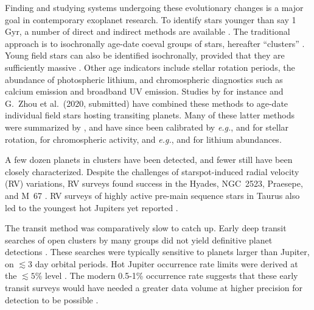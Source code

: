 \documentclass[12pt,twocolumn,tighten]{aastex63}
\begin{document}
Finding and studying systems undergoing these evolutionary changes is
a major goal in contemporary exoplanet research.  To identify stars
younger than say 1$\,$Gyr, a number of direct and indirect methods are
available \citep{soderblom_ages_2010}.  The traditional approach is to
isochronally age-date coeval groups of stars, hereafter ``clusters''
\citep[{\it
e.g.},][]{lada_embedded_2003,zuckerman_young_2004,krumholz_star_2019}.
Young field stars can also be identified
isochronally, provided that they are sufficiently massive \citep{berger_gaia-kepler_2020}. 
Other age indicators include
stellar rotation periods, the abundance of photospheric lithium, and
chromospheric diagnostics such as calcium emission and broadband UV
emission.  Studies by for instance \citet{david_discovery_2018} and
G{.}~Zhou et al{.}~(2020, submitted) have combined these methods to age-date
individual field stars hosting transiting planets.  Many of these latter methods were summarized by
\citet{mamajek_improved_2008}, and have since been calibrated by {\it
e.g.},
\citet{irwin_rotational_2009,barnes_color-period_2015,meibom_spin-down_2015,angus_calibrating_2015}
and \citet{curtis_tess_2019} for stellar rotation,
\citet{zerjal_chromospherically_2017} for chromospheric activity, and
{\it e.g.}, \citet{elliott_search_2016,berger_identifying_2018} and
\citet{zerjal_galah_2019} for lithium abundances.


A few dozen planets in clusters have been detected, and fewer still
have been closely characterized.  Despite the challenges of
starspot-induced radial velocity (RV) variations, RV surveys found
success in the Hyades, NGC~2523, Praesepe, and M~67
\citep{Sato_et_al_2007,lovis_mayor_2007,Quinn_et_al_2012,Malavolta_et_al_2016,brucalassi_search_2017}.
RV surveys of highly active pre-main sequence stars in Taurus also led
to the youngest hot Jupiters yet reported
\citep{donati_hj_2016,johns-krull_candidate_2016,biddle_k2_2018,flagg_co_2019}.

The transit method was comparatively slow to catch up.  Early deep
transit searches of open clusters by many groups did not yield
definitive planet detections
\citep{mochejska_planets_2005,mochejska_planets_2006,burke_survey_2006,aigrain_monitor_2007,irwin_monitordata_2007,miller_monitor_2008,pepper_photometric_2008,hartman_MMT_IV_2009}.
These searches were typically sensitive to planets larger than
Jupiter, on $\lesssim 3$ day orbital periods.  Hot Jupiter occurrence
rate limits were derived at the $\lesssim 5\%$ level \citep[{\it
e.g.},][]{burke_survey_2006,hartman_MMT_IV_2009}.  The modern 0.5-1\%
occurrence rate suggests that these early transit surveys would have needed a
greater data volume at higher precision for detection to be possible
\citep{mayor_harps_2011,wright_frequency_2012,howard_planet_2012,petigura_metallicity_2018}.
\end{document}
